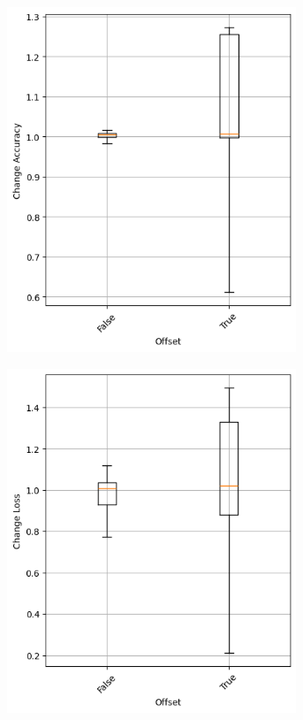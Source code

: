\begin{figure}
    \begin{subfigure}{0.5\textwidth}
        \centering
        \includegraphics[width=0.95\textwidth]{plots/Offset_NotTrained_accuracy.png}
    \end{subfigure}
    \begin{subfigure}{0.5\textwidth}
        \centering
        \includegraphics[width=0.95\textwidth]{plots/Offset_NotTrained_loss.png}

\end{subfigure}
\end{figure}
